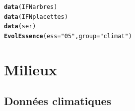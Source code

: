 \documentclass{article}\usepackage[]{graphicx}\usepackage[]{color}
\makeatletter
\newcommand{\hlstr}[1]{\textcolor[rgb]{0.192,0.494,0.8}{#1}}%
\newcommand{\hlstd}[1]{\textcolor[rgb]{0.345,0.345,0.345}{#1}}%
\newcommand{\hlkwc}[1]{\textcolor[rgb]{0.333,0.667,0.333}{#1}}%
\newcommand{\hlkwd}[1]{\textcolor[rgb]{0.737,0.353,0.396}{\textbf{#1}}}%
\newenvironment{kframe}{%
 \def\at@end@of@kframe{}%
 \ifinner\ifhmode%
  \def\at@end@of@kframe{\end{minipage}}%
  \begin{minipage}{\columnwidth}%
 \fi\fi%
 \def\FrameCommand##1{\hskip\@totalleftmargin \hskip-\fboxsep
 \colorbox{shadecolor}{##1}\hskip-\fboxsep
     \hskip-\linewidth \hskip-\@totalleftmargin \hskip\columnwidth}%
 \MakeFramed {\advance\hsize-\width
   \@totalleftmargin\z@ \linewidth\hsize
   \@setminipage}}%
 {\par\unskip\endMakeFramed%
 \at@end@of@kframe}
\newenvironment{knitrout}{}{} %
\makeatother
\begin{document}
\begin{knitrout}\small
{}\color{fgcolor}\begin{kframe}
\begin{alltt}
\hlkwd{data}\hlstd{(IFNarbres)}
\hlkwd{data}\hlstd{(IFNplacettes)}
\hlkwd{data}\hlstd{(ser)}
\hlkwd{EvolEssence}\hlstd{(}\hlkwc{ess}\hlstd{=}\hlstr{"05"}\hlstd{,} \hlkwc{group}\hlstd{=}\hlstr{"climat"}\hlstd{)}
\end{alltt}
\end{kframe}
\end{knitrout}


\section{Milieux}

\subsection{Données climatiques}
\end{document}
